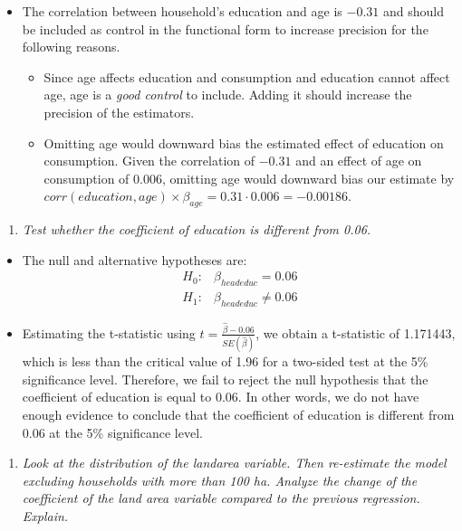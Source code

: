 \documentclass[
  letterpaper,
  DIV=11,
  numbers=noendperiod]{scrartcl}
\providecommand{\tightlist}{%
  \setlength{\itemsep}{0pt}\setlength{\parskip}{0pt}}
\begin{document}
\begin{itemize}
\item
  The correlation between household's education and age is \(-0.31\) and
  should be included as control in the functional form to increase
  precision for the following reasons.

  \begin{itemize}
  \tightlist
  \item
    Since age affects education and consumption and education cannot
    affect age, age is a \emph{good control} to include. Adding it
    should increase the precision of the estimators.
  \item
    Omitting age would downward bias the estimated effect of education
    on consumption. Given the correlation of \(-0.31\) and an effect of
    age on consumption of \(0.006\), omitting age would downward bias
    our estimate by
    \(corr(education, age) \times \beta_{age} = 0.31 \cdot 0.006 = -0.00186\).
  \end{itemize}
\end{itemize}

\begin{enumerate}
\def\labelenumi{\arabic{enumi}.}
\setcounter{enumi}{4}
\tightlist
\item
  \emph{Test whether the coefficient of education is different from
  0.06.}
\end{enumerate}

\begin{itemize}
\item
  The null and alternative hypotheses are: \[
  \begin{aligned}
  H_0: & \beta_{headeduc} = 0.06 \\
  H_1: & \beta_{headeduc} \neq 0.06
  \end{aligned}
  \]
\item
  Estimating the t-statistic using
  \(t = \frac{\hat{\beta} - 0.06}{SE(\hat{\beta})}\), we obtain a
  t-statistic of 1.171443, which is less than the critical value of 1.96
  for a two-sided test at the 5\% significance level. Therefore, we fail
  to reject the null hypothesis that the coefficient of education is
  equal to 0.06. In other words, we do not have enough evidence to
  conclude that the coefficient of education is different from 0.06 at
  the 5\% significance level.
\end{itemize}

\begin{enumerate}
\def\labelenumi{\arabic{enumi}.}
\setcounter{enumi}{5}
\tightlist
\item
  \emph{Look at the distribution of the landarea variable. Then
  re-estimate the model excluding households with more than 100 ha.
  Analyze the change of the coefficient of the land area variable
  compared to the previous regression. Explain.}
\end{enumerate}
\end{document}
